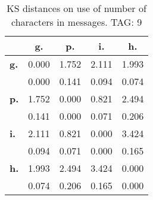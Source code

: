 \begin{table}[h!]
\begin{center}
\begin{tabular}{| l || c | c | c | c |}\hline
 & {\bf g.} & {\bf p.} & {\bf i.} & {\bf h.} \\\hline\hline
{\bf g.} & 0.000 & 1.752 & 2.111 & 1.993 \\
{\bf } & 0.000 & 0.141 & 0.094 & 0.074 \\\hline
{\bf p.} & 1.752 & 0.000 & 0.821 & 2.494 \\
{\bf } & 0.141 & 0.000 & 0.071 & 0.206 \\\hline
{\bf i.} & 2.111 & 0.821 & 0.000 & 3.424 \\
{\bf } & 0.094 & 0.071 & 0.000 & 0.165 \\\hline
{\bf h.} & 1.993 & 2.494 & 3.424 & 0.000 \\
{\bf } & 0.074 & 0.206 & 0.165 & 0.000 \\\hline
\end{tabular}
\caption{KS distances on use of number of characters in messages. TAG: 9}
\end{center}
\end{table}